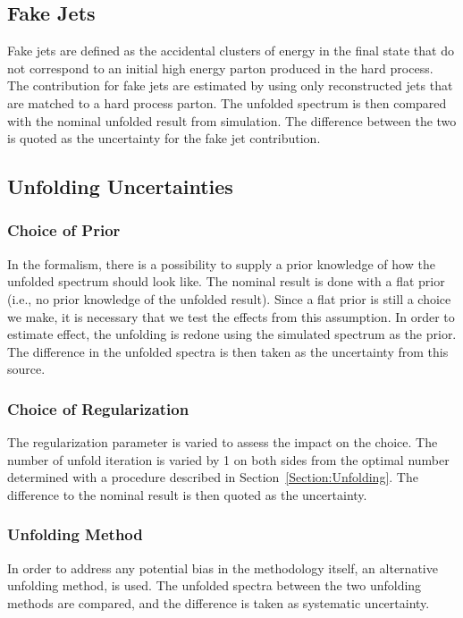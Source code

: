 \subsection{Fake Jets}

Fake jets are defined as the accidental clusters of energy in the final state that do not correspond to an initial high energy parton produced in the hard process.  The contribution for fake jets are estimated by using only reconstructed jets that are matched to a hard process parton.  The unfolded spectrum is then compared with the nominal unfolded result from simulation.  The difference between the two is quoted as the uncertainty for the fake jet contribution.

\subsection{Unfolding Uncertainties}

\subsubsection{Choice of Prior}

In the \Bayes formalism, there is a possibility to supply a prior knowledge of how the unfolded spectrum should look like.  The nominal result is done with a flat prior (i.e., no prior knowledge of the unfolded result).  Since a flat prior is still a choice we make, it is necessary that we test the effects from this assumption.  In order to estimate effect, the unfolding is redone using the simulated spectrum as the prior.  The difference in the unfolded spectra is then taken as the uncertainty from this source.

\subsubsection{Choice of Regularization}

The regularization parameter is varied to assess the impact on the choice.  The number of unfold iteration is varied by 1 on both sides from the optimal number determined with a procedure described in Section~\ref{Section:Unfolding}.  The difference to the nominal result is then quoted as the uncertainty.

\subsubsection{Unfolding Method}

In order to address any potential bias in the \Bayes methodology itself, an alternative unfolding method, \SVD is used.  The unfolded spectra between the two unfolding methods are compared, and the difference is taken as systematic uncertainty.

